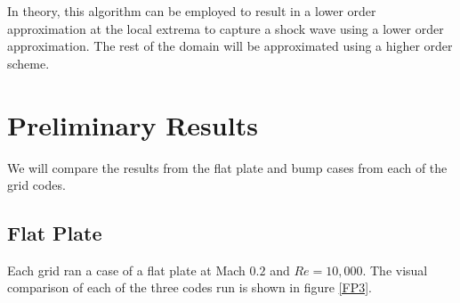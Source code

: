 \documentclass[final]{aiaa-pretty}
\begin{document}
In theory, this algorithm can be employed to result in a lower order approximation at the local extrema to capture a shock wave using a lower order approximation.  The rest of the domain will be approximated using a higher order scheme.  



 
\section{Preliminary Results}
We will compare the results from the flat plate and bump cases from each of the grid codes.
\subsection{Flat Plate}
Each grid ran a case of a flat plate at Mach $0.2$ and $Re = 10,000$.  The visual comparison of each of the three codes run is shown in figure \ref{FP3}.
\end{document}
